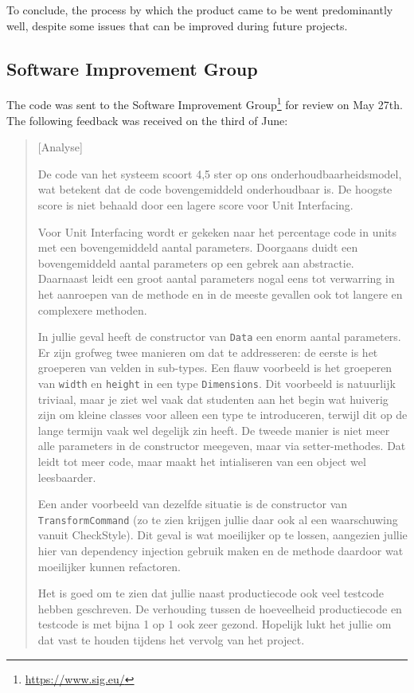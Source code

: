 To conclude, the process by which the product came to be went predominantly
well, despite some issues that can be improved during future projects.

\subsection{Software Improvement Group}
\label{ssec:sig}

The code was sent to the Software Improvement
Group\footnote{\url{https://www.sig.eu/}} for review on May 27th. The following
feedback was received on the third of June:

\begin{quotation}
[Analyse]

De code van het systeem scoort 4,5 ster op ons onderhoudbaarheidsmodel, wat
betekent dat de code bovengemiddeld onderhoudbaar is. De hoogste score is niet
behaald door een lagere score voor Unit Interfacing.

Voor Unit Interfacing wordt er gekeken naar het percentage code in units met een
bovengemiddeld aantal parameters. Doorgaans duidt een bovengemiddeld aantal
parameters op een gebrek aan abstractie. Daarnaast leidt een groot aantal
parameters nogal eens tot verwarring in het aanroepen van de methode en in de
meeste gevallen ook tot langere en complexere methoden.

In jullie geval heeft de constructor van \texttt{Data} een enorm aantal
parameters. Er zijn grofweg twee manieren om dat te addresseren: de eerste is
het groeperen van velden in sub-types. Een flauw voorbeeld is het groeperen van
\texttt{width} en \texttt{height} in een type \texttt{Dimensions}.
Dit voorbeeld is natuurlijk triviaal, maar je ziet wel vaak dat studenten aan
het begin wat huiverig zijn om kleine classes voor alleen een type te
introduceren, terwijl dit op de lange termijn vaak wel degelijk zin heeft. De
tweede manier is niet meer alle parameters in de constructor meegeven, maar via
setter-methodes. Dat leidt tot meer code, maar maakt het intialiseren van een
object wel leesbaarder.

Een ander voorbeeld van dezelfde situatie is de constructor van
\texttt{TransformCommand} (zo te zien krijgen jullie daar ook al een
waarschuwing vanuit CheckStyle). Dit geval is wat moeilijker op te lossen,
aangezien jullie hier van dependency injection gebruik maken en de methode
daardoor wat moeilijker kunnen refactoren.

Het is goed om te zien dat jullie naast productiecode ook veel testcode hebben
geschreven. De verhouding tussen de hoeveelheid productiecode en testcode is met
bijna 1 op 1 ook zeer gezond. Hopelijk lukt het jullie om dat vast te houden
tijdens het vervolg van het project.
\end{quotation}

